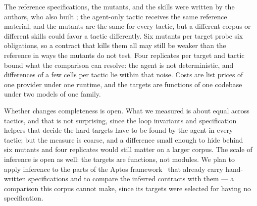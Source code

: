 The reference specifications, the mutants, and the skills were written by the authors,
who also built \WP; the agent-only tactic receives the same reference material, and the
mutants are the same for every tactic, but a different corpus or different skills could
favor a tactic differently. Six mutants per target probe six obligations, so a contract
that kills them all may still be weaker than the reference in ways the mutants do not
test. Four replicates per target and tactic bound what the comparison can resolve: the agent is not
deterministic, and differences of a few cells per tactic lie within that noise. Costs are
list prices of one provider under one runtime, and the targets are functions of one
codebase under two models of one family.

Whether \WP changes completeness is open. What we measured is about equal across
tactics, and that is not surprising, since the loop invariants and specification helpers
that decide the hard targets have to be found by the agent in every tactic; but the
measure is coarse, and a difference small enough to hide behind six mutants and four
replicates would still matter on a larger corpus. The scale of inference is open as well:
the targets are functions, not modules. We plan to apply inference to the parts of the
Aptos framework~\cite{AptosFrameworkBook} that already carry hand-written specifications
and to compare the inferred contracts with them --- a comparison this corpus cannot make,
since its targets were selected for having no specification.

\label{sec:related}


